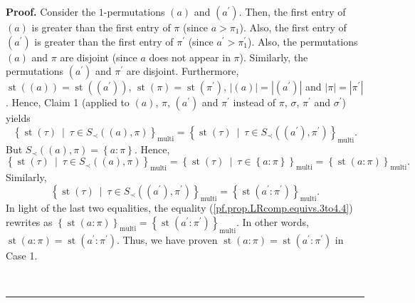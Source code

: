 \documentclass[numbers=enddot,12pt,final,onecolumn,notitlepage]{scrartcl}%
\theoremstyle{definition}
\newenvironment{proof}[1][Proof]{\noindent\textbf{#1.} }{\ \rule{0.5em}{0.5em}}
\begin{document}
\begin{proof}
Consider the $1$-permutations $\left(  a\right)  $ and $\left(  a^{\prime
}\right)  $. Then, the first entry of $\left(  a\right)  $ is greater than the
first entry of $\pi$ (since $a>\pi_{1}$). Also, the first entry of $\left(
a^{\prime}\right)  $ is greater than the first entry of $\pi^{\prime}$ (since
$a^{\prime}>\pi_{1}^{\prime}$). Also, the permutations $\left(  a\right)  $
and $\pi$ are disjoint (since $a$ does not appear in $\pi$). Similarly, the
permutations $\left(  a^{\prime}\right)  $ and $\pi^{\prime}$ are disjoint.
Furthermore, $\operatorname*{st}\left(  \left(  a\right)  \right)
=\operatorname*{st}\left(  \left(  a^{\prime}\right)  \right)  $,
$\operatorname*{st}\left(  \pi\right)  =\operatorname*{st}\left(  \pi^{\prime
}\right)  $, $\left\vert \left(  a\right)  \right\vert =\left\vert \left(
a^{\prime}\right)  \right\vert $ and $\left\vert \pi\right\vert =\left\vert
\pi^{\prime}\right\vert $. Hence, Claim 1 (applied to $\left(  a\right)  $,
$\pi$, $\left(  a^{\prime}\right)  $ and $\pi^{\prime}$ instead of $\pi$,
$\sigma$, $\pi^{\prime}$ and $\sigma^{\prime}$) yields%
\begin{equation}
\left\{  \operatorname*{st}\left(  \tau\right)  \ \mid\ \tau\in S_{\prec
}\left(  \left(  a\right)  ,\pi\right)  \right\}  _{\operatorname*{multi}%
}=\left\{  \operatorname*{st}\left(  \tau\right)  \ \mid\ \tau\in S_{\prec
}\left(  \left(  a^{\prime}\right)  ,\pi^{\prime}\right)  \right\}
_{\operatorname*{multi}}. \label{pf.prop.LRcomp.equivs.3to4.4}%
\end{equation}
But $S_{\prec}\left(  \left(  a\right)  ,\pi\right)  =\left\{  a:\pi\right\}
$. Hence,%
\[
\left\{  \operatorname*{st}\left(  \tau\right)  \ \mid\ \tau\in S_{\prec
}\left(  \left(  a\right)  ,\pi\right)  \right\}  _{\operatorname*{multi}%
}=\left\{  \operatorname*{st}\left(  \tau\right)  \ \mid\ \tau\in\left\{
a:\pi\right\}  \right\}  _{\operatorname*{multi}}=\left\{  \operatorname*{st}%
\left(  a:\pi\right)  \right\}  _{\operatorname*{multi}}.
\]
Similarly,%
\[
\left\{  \operatorname*{st}\left(  \tau\right)  \ \mid\ \tau\in S_{\prec
}\left(  \left(  a^{\prime}\right)  ,\pi^{\prime}\right)  \right\}
_{\operatorname*{multi}}=\left\{  \operatorname*{st}\left(  a^{\prime}%
:\pi^{\prime}\right)  \right\}  _{\operatorname*{multi}}.
\]
In light of the last two equalities, the equality
(\ref{pf.prop.LRcomp.equivs.3to4.4}) rewrites as $\left\{  \operatorname*{st}%
\left(  a:\pi\right)  \right\}  _{\operatorname*{multi}}=\left\{
\operatorname*{st}\left(  a^{\prime}:\pi^{\prime}\right)  \right\}
_{\operatorname*{multi}}$. In other words, $\operatorname*{st}\left(
a:\pi\right)  =\operatorname*{st}\left(  a^{\prime}:\pi^{\prime}\right)  $.
Thus, we have proven $\operatorname*{st}\left(  a:\pi\right)
=\operatorname*{st}\left(  a^{\prime}:\pi^{\prime}\right)  $ in Case 1.


\end{proof}
\end{document}
